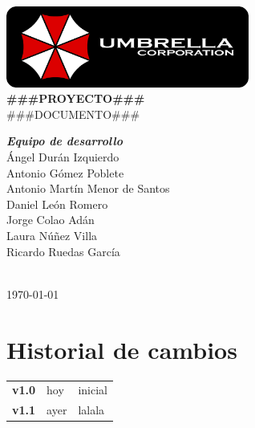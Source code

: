 \documentclass[a4paper,11pt,oneside]{report}
\begin{document}
\renewcommand\listtablename{Índice de tablas}
\renewcommand\tablename{Tabla}

\pagestyle{plain}



\begin{titlepage}
\begin{center}

\includegraphics[width=0.6\textwidth]{logo-umbrella.png}\\[4cm]

{\huge \textbf{\#\#\#PROYECTO\#\#\#}}\\[0.5cm]
{\huge {\#\#\#DOCUMENTO\#\#\#}}\\[4cm]

\begin{minipage}{0.5\textwidth}
\large
\hspace{1cm}\textbf{\emph{Equipo de desarrollo}}\\
Ángel Durán Izquierdo\\
Antonio Gómez Poblete\\
Antonio Martín Menor de Santos\\
Daniel León Romero\\
Jorge Colao Adán\\
Laura Núñez Villa\\
Ricardo Ruedas García\\
\end{minipage}\\[2cm]

{\Large \today}
\end{center}
\end{titlepage}


\clearpage
{}
\setcounter{page}{1}

\chapter*{Historial de cambios}

\begin{center}
\begin{tabularx}{\textwidth}{p{}p{}X}
\textbf{v1.0} & hoy & inicial\\
\textbf{v1.1} & ayer & lalala
\end{tabularx}
\end{center}
\end{document}
